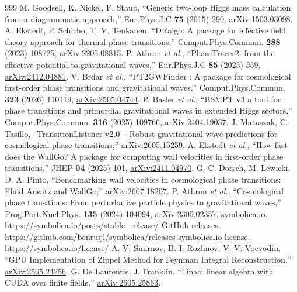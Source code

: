 \documentclass[a4paper,10pt]{ltjsarticle}
\begin{document}
\begin{thebibliography}{999}
 M. Goodsell, K. Nickel, F. Staub, ``Generic two-loop Higgs mass calculation from a diagrammatic approach,'' Eur.Phys.J.C \textbf{75} (2015) 290, \href{https://arxiv.org/abs/1503.03098}{arXiv:1503.03098}.
 A. Ekstedt, P. Schicho, T. V. Tenkanen, ``DRalgo: A package for effective field theory approach for thermal phase transitions,'' Comput.Phys.Commun. \textbf{288} (2023) 108725, \href{https://arxiv.org/abs/2205.08815}{arXiv:2205.08815}.
 P. Athron \textit{et al.}, ``PhaseTracer2: from the effective potential to gravitational waves,'' Eur.Phys.J.C \textbf{85} (2025) 559, \href{https://arxiv.org/abs/2412.04881}{arXiv:2412.04881}.
 V. Brdar \textit{et al.}, ``$\text{PT2GWFinder}$ : A package for cosmological first-order phase transitions and gravitational waves,'' Comput.Phys.Commun. \textbf{323} (2026) 110119, \href{https://arxiv.org/abs/2505.04744}{arXiv:2505.04744}.
 P. Basler \textit{et al.}, ``BSMPT v3 a tool for phase transitions and primordial gravitational waves in extended Higgs sectors,'' Comput.Phys.Commun. \textbf{316} (2025) 109766, \href{https://arxiv.org/abs/2404.19037}{arXiv:2404.19037}.
 J. Matuszak, C. Tasillo, ``TransitionListener v2.0 -- Robust gravitational wave predictions for cosmological phase transitions,'' \href{https://arxiv.org/abs/2605.15259}{arXiv:2605.15259}.
 A. Ekstedt \textit{et al.}, ``How fast does the WallGo? A package for computing wall velocities in first-order phase transitions,'' JHEP \textbf{04} (2025) 101, \href{https://arxiv.org/abs/2411.04970}{arXiv:2411.04970}.
 G. C. Dorsch, M. Lewicki, D. A. Pinto, ``Benchmarking wall velocities in cosmological phase transitions: Fluid Ansatz and WallGo,'' \href{https://arxiv.org/abs/2607.18207}{arXiv:2607.18207}.
 P. Athron \textit{et al.}, ``Cosmological phase transitions: From perturbative particle physics to gravitational waves,'' Prog.Part.Nucl.Phys. \textbf{135} (2024) 104094, \href{https://arxiv.org/abs/2305.02357}{arXiv:2305.02357}.
 symbolica.io. \url{https://symbolica.io/posts/stable_release/}
 GitHub releases. \url{https://github.com/benruijl/symbolica/releases}
 symbolica.io license. \url{https://symbolica.io/license/}
 A. V. Smirnov, B. I. Rozhnov, V. V. Voevodin, ``GPU Implementation of Zippel Method for Feynman Integral Reconstruction,'' \href{https://arxiv.org/abs/2505.24256}{arXiv:2505.24256}.
 G. De Laurentis, J. Franklin, ``Linac: linear algebra with CUDA over finite fields,'' \href{https://arxiv.org/abs/2605.25863}{arXiv:2605.25863}.

\end{thebibliography}
\end{document}
